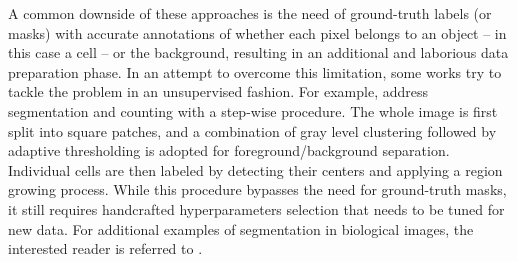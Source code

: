 A common downside of these approaches is  the need of ground-truth labels (or masks) with accurate annotations of whether each pixel belongs to an object -- in this case a cell -- or the background, resulting in an additional and laborious data preparation phase.
In an attempt to overcome this limitation, some works try to tackle the problem in an unsupervised fashion. For example,  address segmentation and counting with a step-wise procedure. The whole image is first split into square patches, and a combination of gray level clustering followed by adaptive thresholding is adopted for foreground/background separation. Individual cells are then labeled by detecting their centers and applying a region growing process. 
While this procedure bypasses the need for ground-truth masks, it still requires handcrafted hyperparameters selection that needs to be tuned for new data.
For additional examples of segmentation in biological images, the interested reader is referred to .